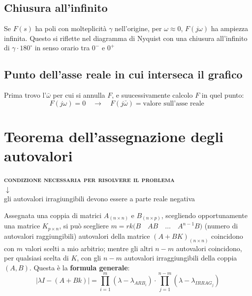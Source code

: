 \documentclass{report}
\theoremstyle{nostyle}
\begin{document}
\subsection{Chiusura all'infinito}
Se $F(s)$ ha poli con molteplicità $\gamma$ nell'origine, per $\omega\approx 0$, $F(j\omega)$ ha ampiezza infinita. Questo si riflette nel diagramma di Nyquist con una chiusura all'infinito di $\gamma \cdot 180^\circ$ in senso orario tra $0^-$ e $0^+$


\subsection{Punto dell'asse reale in cui interseca il grafico}
Prima trovo l'$\bar{\omega}$ per cui si annulla $F$, e suucessivamente calcolo $F$ in quel punto:
\[        F(j\omega) = 0 \quad \to \quad F(j\bar{\omega}) = \text{valore sull'asse reale }          \] 

\section{Teorema dell'assegnazione degli autovalori}
\begin{center}
    \textsc{\textbf{condizione necessaria per risolvere il problema}}\\
    $\downarrow $\\
    gli autovalori irragiungibili devono essere a parte reale negativa
\end{center}


\noindent Assegnata una coppia di matrici $A_{(n \times n)}$ e $B_{(n \times p)}$, scegliendo opportunamente una matrice $K_{p \times n}$, si può scegliere $m = rk \big(  B \quad AB \quad \dots \quad A^{n-1}B    \big)$ (numero di autovalori raggiungibili)
autovalori della matrice $(A+BK)_{(n\times n)}$ coincidono con $m$ valori scelti a mio arbitrio; mentre gli altri $n-m$ autovalori coincidono, per qualsiasi scelta di $K$, con gli $n-m$ autovalori irraggiungibili della coppia $(A,B)$.
Questa è la \textbf{formula generale}:
\[       \left|  \lambda I -(A+Bk)   \right|   = \prod_{i = 1}^{m} (\lambda - \lambda_{ARB_i}) \cdot \prod_{j = 1}^{n-m} (\lambda-\lambda_{IRRAG_j})    \]
\end{document}
